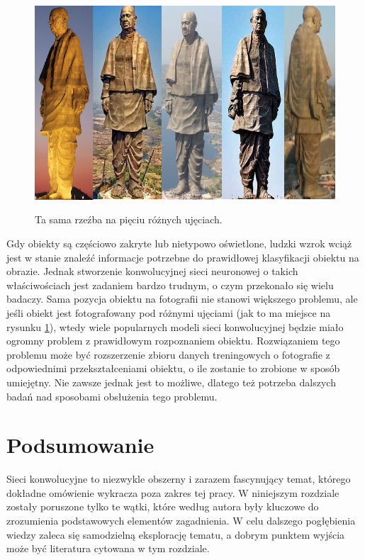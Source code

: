 \begin{figure}[h]
\begin{center}
\includegraphics[width=15cm]{resources/figures/object_with_transitions.png}
\caption{Ta sama rzeźba na pięciu różnych ujęciach.}
\label{SculptPhotos}
\end{center}
\end{figure}

\vspace*{-1.5cm}
Gdy obiekty są częściowo zakryte lub nietypowo oświetlone, ludzki wzrok wciąż jest w stanie znaleźć informacje potrzebne do prawidłowej klasyfikacji obiektu na obrazie. Jednak stworzenie konwolucyjnej sieci neuronowej o takich właściwościach jest zadaniem bardzo trudnym, o czym przekonało się wielu badaczy. Sama pozycja obiektu na fotografii nie stanowi większego problemu, ale jeśli obiekt jest fotografowany pod różnymi ujęciami (jak to ma miejsce na rysunku \ref{SculptPhotos}), wtedy wiele popularnych modeli sieci konwolucyjnej będzie miało ogromny problem z prawidłowym rozpoznaniem obiektu. Rozwiązaniem tego problemu może być rozszerzenie zbioru danych treningowych o fotografie z odpowiednimi przekształceniami obiektu, o ile zostanie to zrobione w sposób umiejętny. Nie zawsze jednak jest to możliwe, dlatego też potrzeba dalszych badań nad sposobami obsłużenia tego problemu.

\section{Podsumowanie}
Sieci konwolucyjne to niezwykle obszerny i zarazem fascynujący temat, którego dokładne omówienie wykracza poza zakres tej pracy. W niniejszym rozdziale zostały poruszone tylko te wątki, które według autora były kluczowe do zrozumienia podstawowych elementów zagadnienia. W celu dalszego pogłębienia wiedzy zaleca się samodzielną eksplorację tematu, a dobrym punktem wyjścia może być literatura cytowana w tym rozdziale.